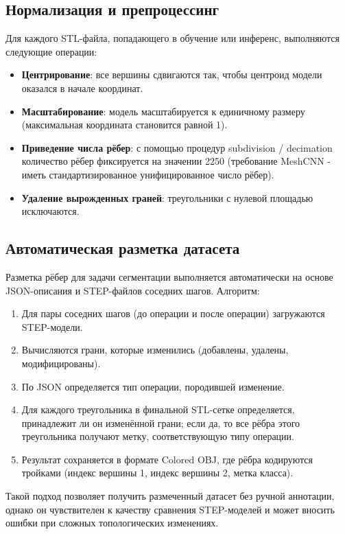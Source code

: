 \subsection{Нормализация и препроцессинг}
Для каждого STL-файла, попадающего в обучение или инференс, выполняются следующие операции:
\begin{itemize}
    \item \textbf{Центрирование}: все вершины сдвигаются так, чтобы центроид модели оказался в начале координат.
    \item \textbf{Масштабирование}: модель масштабируется к единичному размеру (максимальная координата становится равной 1).
    \item \textbf{Приведение числа рёбер}: с помощью процедур subdivision / decimation количество рёбер фиксируется на значении 2250 (требование MeshCNN - иметь стандартизированное унифицированное число рёбер).
    \item \textbf{Удаление вырожденных граней}: треугольники с нулевой площадью исключаются.
\end{itemize}

\subsection{Автоматическая разметка датасета}
Разметка рёбер для задачи сегментации выполняется автоматически на основе JSON-описания и STEP-файлов соседних шагов. Алгоритм:
\begin{enumerate}
    \item Для пары соседних шагов (до операции и после операции) загружаются STEP-модели.
    \item Вычисляются грани, которые изменились (добавлены, удалены, модифицированы).
    \item По JSON определяется тип операции, породившей изменение.
    \item Для каждого треугольника в финальной STL-сетке определяется, принадлежит ли он изменённой грани; если да, то все рёбра этого треугольника получают метку, соответствующую типу операции.
    \item Результат сохраняется в формате Colored OBJ, где рёбра кодируются тройками (индекс вершины 1, индекс вершины 2, метка класса).
\end{enumerate}
Такой подход позволяет получить размеченный датасет без ручной аннотации, однако он чувствителен к качеству сравнения STEP-моделей и может вносить ошибки при сложных топологических изменениях.

